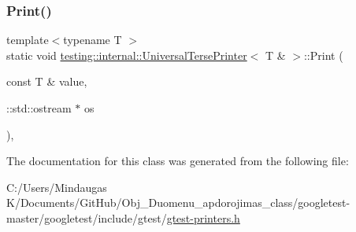 \subsubsection{\texorpdfstring{Print()}{Print()}\hspace{0.1cm}{\footnotesize\ttfamily [3/3]}}
{\footnotesize\ttfamily template$<$typename T $>$ \\
static void \mbox{\hyperlink{classtesting_1_1internal_1_1_universal_terse_printer}{testing\+::internal\+::\+Universal\+Terse\+Printer}}$<$ T \& $>$\+::Print (\begin{DoxyParamCaption}\item[{const T \&}]{value,  }\item[{\+::std\+::ostream $\ast$}]{os }\end{DoxyParamCaption})\hspace{0.3cm}{\ttfamily [inline]}, {\ttfamily [static]}}



The documentation for this class was generated from the following file\+:\begin{DoxyCompactItemize}
\item 
C\+:/\+Users/\+Mindaugas K/\+Documents/\+Git\+Hub/\+Obj\+\_\+\+Duomenu\+\_\+apdorojimas\+\_\+class/googletest-\/master/googletest/include/gtest/\mbox{\hyperlink{googletest-master_2googletest_2include_2gtest_2gtest-printers_8h}{gtest-\/printers.\+h}}\end{DoxyCompactItemize}
